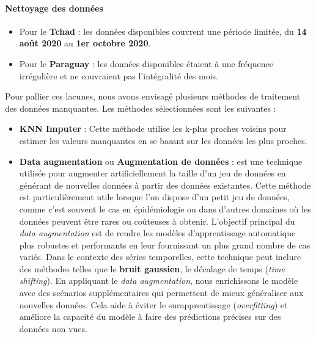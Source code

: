\paragraph*{Nettoyage des données}
\begin{itemize}
	\item Pour le \textbf{Tchad} : les données disponibles couvrent une période limitée, du \textbf{14 août 2020} au \textbf{1er octobre 2020}.
	\item Pour le \textbf{Paraguay} : les données disponibles étaient à une fréquence irrégulière et ne couvraient pas l'intégralité des mois.
\end{itemize}

Pour pallier ces lacunes, nous avons envisagé plusieurs méthodes de traitement des données manquantes. Les méthodes sélectionnées sont les suivantes :

\begin{itemize}
	\item \textbf{KNN Imputer} : Cette méthode utilise les k-plus proches voisins pour estimer les valeurs manquantes en se basant sur les données les plus proches.
	\item \textbf{Data  augmentation} ou \textbf{Augmentation de données} : est une technique utilisée pour augmenter artificiellement la taille d'un jeu de données en générant de nouvelles données à partir des données existantes. Cette méthode est particulièrement utile lorsque l'on dispose d'un petit jeu de données, comme c'est souvent le cas en épidémiologie ou dans d'autres domaines où les données peuvent être rares ou coûteuses à obtenir.	
	L'objectif principal du \textit{data augmentation} est de rendre les modèles d'apprentissage automatique plus robustes et performants en leur fournissant un plus grand nombre de cas variés. Dans le contexte des séries temporelles, cette technique peut inclure des méthodes telles que le \textbf{bruit gaussien}, le décalage de temps (\textit{time shifting}).
	En appliquant le \textit{data augmentation}, nous enrichissons le modèle avec des scénarios supplémentaires qui permettent de mieux généraliser aux nouvelles données. Cela aide à éviter le surapprentissage (\textit{overfitting}) et améliore la capacité du modèle à faire des prédictions précises sur des données non vues.
\end{itemize}
\newpage
